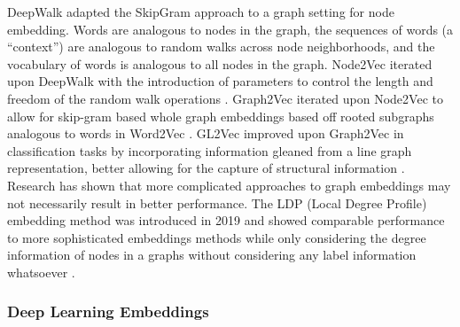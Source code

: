 \documentclass[
  super,
  preprint,
  3p]{elsarticle}
\begin{document}
DeepWalk adapted the SkipGram approach to a graph setting
\citep{perozzi_deepwalk_2014} for node embedding. Words are analogous to
nodes in the graph, the sequences of words (a ``context'') are analogous
to random walks across node neighborhoods, and the vocabulary of words
is analogous to all nodes in the graph. Node2Vec iterated upon DeepWalk
with the introduction of parameters to control the length and freedom of
the random walk operations \citep{RN40}. Graph2Vec iterated upon
Node2Vec to allow for skip-gram based whole graph embeddings based off
rooted subgraphs analogous to words in Word2Vec
\citep{narayanan_graph2vec_2017}. GL2Vec improved upon Graph2Vec in
classification tasks by incorporating information gleaned from a line
graph representation, better allowing for the capture of structural
information \citep{RN42}. Research has shown that more complicated
approaches to graph embeddings may not necessarily result in better
performance. The LDP (Local Degree Profile) embedding method was
introduced in 2019 and showed comparable performance to more
sophisticated embeddings methods while only considering the degree
information of nodes in a graphs without considering any label
information whatsoever \citep{RN32}.

\subsubsection{Deep Learning Embeddings}\label{deep-learning-embeddings}
\end{document}
